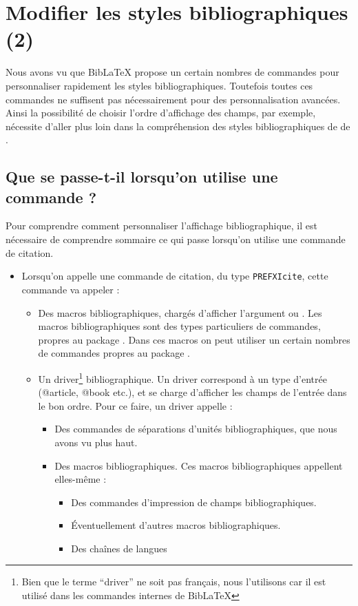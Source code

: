 \chapter{Modifier les styles bibliographiques (2)}

\begin{prealable}
	Nous avons vu que BibLaTeX propose un certain nombres de commandes pour personnaliser rapidement les styles bibliographiques. Toutefois toutes ces commandes ne suffisent pas nécessairement pour des personnalisation avancées. 
	Ainsi la possibilité de choisir l'ordre d'affichage des champs, par exemple, nécessite d'aller plus loin dans la compréhension des styles bibliographiques de de .
\end{prealable}



\section{Que se passe-t-il lorsqu'on utilise une commande  ?}

Pour comprendre comment personnaliser l'affichage bibliographique, il est nécessaire de comprendre sommaire ce qui passe lorsqu'on utilise une commande de citation. 

\begin{itemize}
\item Lorsqu'on appelle une commande de citation, du type \verb|PREFXIcite|, cette commande va appeler :
	\begin{itemize}
		\item Des macros bibliographiques, chargés d'afficher l'argument  ou . Les macros bibliographiques sont des types particuliers de commandes, propres au package . Dans ces macros on peut utiliser un certain nombres de commandes propres au package . 
		\item Un driver\footnote{Bien que le terme \enquote{driver} ne soit pas français, nous l'utilisons car il est utilisé dans les commandes internes de BibLaTeX} bibliographique. Un driver correspond à un type d'entrée (@article, @book etc.), et se charge d'afficher les champs de l'entrée dans le bon ordre. Pour ce faire, un driver appelle :
		\begin{itemize}
			\item Des commandes de séparations d'unités bibliographiques, que nous avons vu plus haut.
			\item Des macros bibliographiques. Ces macros bibliographiques appellent elles-même :
			\begin{itemize}
				\item Des commandes d'impression de champs bibliographiques.
				\item Éventuellement d'autres macros bibliographiques.
				\item Des chaînes de langues
			\end{itemize}
		\end{itemize}
		
	\end{itemize}
\end{itemize}

